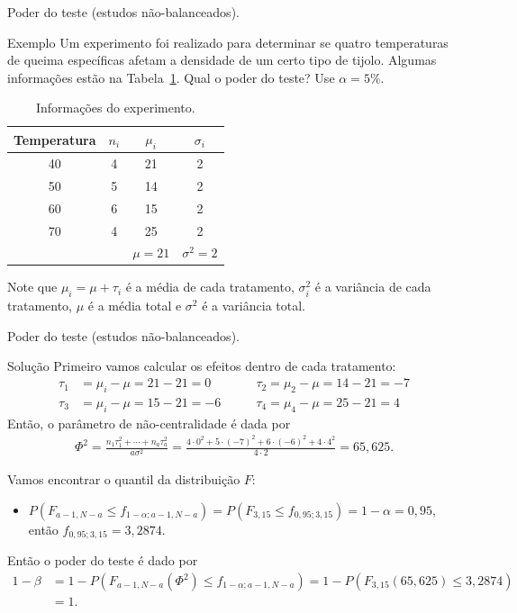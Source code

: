 \documentclass[8pt]{beamer}
\begin{document}
\begin{frame}{Poder do teste (estudos não-balanceados).}

\begin{block}{Exemplo}
	Um experimento foi realizado para determinar se quatro temperaturas de queima específicas afetam a densidade de um certo tipo de tijolo. Algumas informações estão na Tabela~\ref{tab:anova-unbalanced-power}. Qual o poder do teste? Use $\alpha=5\%$.
	\begin{table}[htbp]
		\centering
		\begin{tabular}{c|ccc}
			\toprule[0.05cm]
			Temperatura & $n_i$ & $\mu_i$ & $\sigma_i$ \\ \midrule[0.025cm]
			40  & 4 & 21 & 2 \\
			50  & 5 & 14 & 2  \\
			60  & 6 & 15 & 2 \\
			70  & 4 & 25 & 2\\ \midrule[0.025cm]
			    &   & $\mu = 21$ & $\sigma^2 = 2$\\
			\bottomrule[0.05cm]
		\end{tabular}
		\caption{Informações do experimento.}
		\label{tab:anova-unbalanced-power}
	\end{table}
	Note que $\mu_i = \mu + \tau_i$ é a média de cada tratamento, $\sigma^2_i$ é a variância de cada  tratamento, $\mu$ é a média total e $\sigma^2$ é a variância total.
\end{block}

\end{frame}

\begin{frame}{Poder do teste (estudos não-balanceados).}
	\begin{block}{Solução}
		Primeiro vamos calcular os efeitos dentro de cada tratamento:
		\begin{align*}
			\tau_1 &= \mu_i - \mu = 21 - 21 = 0 \qquad & \tau_2 = \mu_2 - \mu = 14 - 21 = -7\\
			\tau_3 &= \mu_i - \mu = 15 - 21 = -6 \qquad & \tau_4= \mu_4 - \mu = 25 - 21 = 4
		\end{align*}
		Então, o parâmetro de não-centralidade é dada por
		\begin{align*}
		\Phi^2 = \frac{n_1\tau_1^2 + \cdots + n_a\tau_a^2}{a \sigma^2} = \frac{4\cdot 0^2 + 5 \cdot (-7)^2 + 6 \cdot (-6)^2 + 4 \cdot 4^2}{4 \cdot 2} = 65,625.
		\end{align*}
		
		Vamos encontrar o quantil da distribuição $F$:
		\begin{itemize}
			\item $P(F_{a-1, N-a} \leq f_{1-\alpha;a-1, N-a}) = P(F_{3, 15} \leq f_{0,95;3, 15}) = 1 - \alpha = 0,95$, então $f_{0,95;3, 15}=3,2874$.
		\end{itemize}
	
	Então o poder do teste é dado por
	\begin{align*}
		1- \beta &= 1 - P(F_{a-1, N - a}(\Phi^2) \leq f_{1-\alpha;a-1, N-a}) = 1 - P\left( F_{3, 15}(65,625) \leq 3,2874 \right)\\
		&= 1.
	\end{align*}
	\end{block}
\end{frame}
\end{document}
